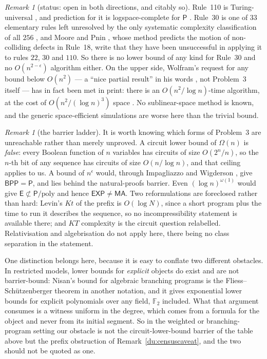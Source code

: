 \documentclass[11pt]{article}
\theoremstyle{definition}
\theoremstyle{remark}
\newtheorem{remark}[theorem]{Remark}
\newcommand{\F}{\mathbb{F}_2}
\begin{document}
\begin{remark}[status: open in both directions, and citably so]\label{p3:status}
Rule~110 is Turing-universal \cite{Cook}, and prediction for it is logspace-complete for $\mathsf{P}$ \cite[Thm.~1]{NW}. Rule~30 is one of
$33$ elementary rules left unresolved by the only systematic complexity classification of all $256$
\cite[\S4.1]{Meunier}, and Moore and Pnin \cite{Moore98}, whose method predicts the motion of non-colliding defects in Rule~18, write that they have been
unsuccessful in applying it to rules $22$, $30$ and $110$. So there is no lower bound of any kind for
Rule~30 and no $O(n^{2-\epsilon})$ algorithm either. On the upper side, Wolfram's request for any bound below
$O(n^{2})$ --- a ``nice partial result'' in his words \cite{Wolfram}, not Problem~3 itself --- has in fact been met in print: there is an $O(n^{2}/\log n)$-time algorithm, at the cost of
$O(n^{2}/(\log n)^{3})$ space \cite{NA}. No sublinear-space
method is known, and the generic space-efficient simulations are worse here than the trivial bound.
\end{remark}

\begin{remark}[the barrier ladder]\label{p3:barriers}
It is worth knowing which forms of Problem~3 are unreachable rather than merely unproved. A circuit
lower bound of $\Omega(n)$ is \emph{false}: every Boolean function of $n$ variables has circuits of size
$O(2^{n}/n)$, so the $n$-th bit of any sequence has circuits of size $O(n/\log n)$, and that ceiling
applies to us. A bound of $n^{\epsilon}$ would, through Impagliazzo and Wigderson \cite{IW}, give
$\mathsf{BPP}=\mathsf{P}$, and lies behind the natural-proofs barrier. Even $(\log n)^{\omega(1)}$ would
give $\mathsf{E}\not\subset\mathsf{P}/\mathrm{poly}$ and hence $\mathsf{EXP}\ne\mathsf{MA}$. Two
reformulations are foreclosed rather than hard: Levin's $Kt$ of the prefix is $O(\log N)$, since a short
program plus the time to run it describes the sequence, so no incompressibility statement is available
there; and $KT$ complexity is the circuit question relabelled. Relativisation and algebrisation do not apply here, there being no class separation in the statement.

One distinction belongs here, because it is easy to conflate two different obstacles. In restricted
models, lower bounds for \emph{explicit} objects do exist and are not barrier-bound: Nisan's bound for
algebraic branching programs is the Fliess--Sch\"utzenberger theorem in another notation, and it gives
exponential lower bounds for explicit polynomials over any field, $\F$ included. What that argument
consumes is a witness uniform in the degree, which comes from a formula for the object and never from
its initial segment. So in the weighted or branching-program setting our obstacle is not the
circuit-lower-bound barrier of the table above but the prefix obstruction of
Remark~\ref{du:censuscaveat}, and the two should not be quoted as one.
\end{remark}
\end{document}

